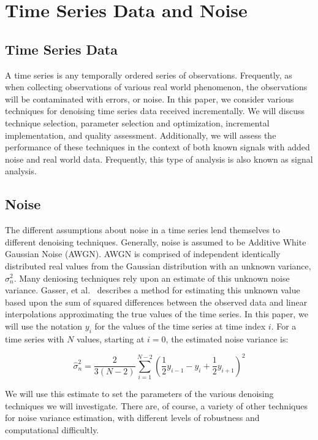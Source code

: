 \documentclass[11pt]{article}
\theoremstyle{definition}
\begin{document}
 
\section{Time Series Data and Noise}


\subsection{Time Series Data}

A time series is any temporally ordered series of observations. Frequently, as when collecting observations of various real world phenomenon, the observations will be contaminated with errors, or noise. In this paper, we consider various techniques for denoising time series data received incrementally. We will discuss technique selection, parameter selection and optimization, incremental implementation, and quality assessment. Additionally, we will assess the performance of these techniques in the context of both known signals with added noise and real world data. Frequently, this type of analysis is also known as signal analysis.

\subsection{Noise}

The different assumptions about noise in a time series lend themselves to different denoising techniques.  Generally, noise is assumed to be Additive White Gaussian Noise (AWGN). AWGN is comprised of independent identically distributed real values from the Gaussian distribution with an unknown variance, $\sigma ^2_n$. Many deniosing techniques rely upon an estimate of this unknown noise variance. Gasser, et al.~\cite{Gasser86} describes a method for estimating this unknown value based upon the sum of squared differences between the observed data and linear interpolations approximating the true values of the time series. In this paper, we will use the notation $y_i$ for the values of the time series at time index $i$. For a time series with $N$ values, starting at $i = 0$, the estimated noise variance is:

\begin{displaymath}
\hat{\sigma} ^2_n = \frac{2}{3 \left( N - 2 \right)} \sum _{i = 1} ^{N - 2} \left( \frac{1}{2} y_{i - 1} - y_i + \frac{1}{2} y_{i + 1} \right) ^2
\end{displaymath}

We will use this estimate to set the parameters of the various denoising techniques we will investigate. There are, of course, a variety of other techniques for noise variance estimation, with different levels of robustness and computational difficultly.
\end{document}
